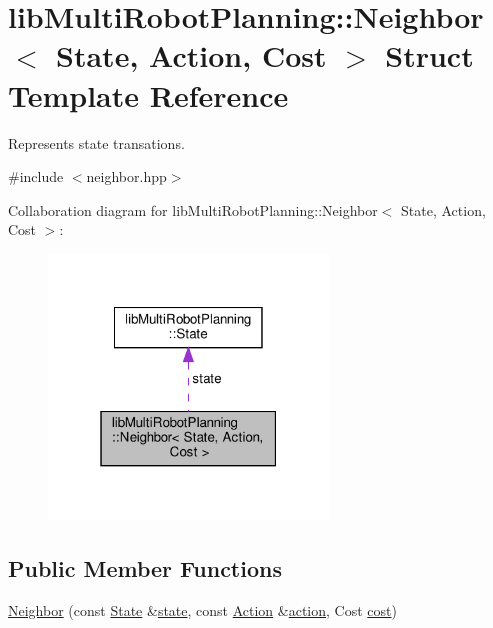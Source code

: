 \hypertarget{structlib_multi_robot_planning_1_1_neighbor}{}\section{lib\+Multi\+Robot\+Planning\+:\+:Neighbor$<$ State, Action, Cost $>$ Struct Template Reference}
\label{structlib_multi_robot_planning_1_1_neighbor}


Represents state transations.  




{\ttfamily \#include $<$neighbor.\+hpp$>$}



Collaboration diagram for lib\+Multi\+Robot\+Planning\+:\+:Neighbor$<$ State, Action, Cost $>$\+:
\nopagebreak
\begin{figure}[H]
\begin{center}
\leavevmode
\includegraphics[width=211pt]{structlib_multi_robot_planning_1_1_neighbor__coll__graph}
\end{center}
\end{figure}
\subsection*{Public Member Functions}
\begin{DoxyCompactItemize}
\item 
\hyperlink{structlib_multi_robot_planning_1_1_neighbor_a048152420e26c75abca920a4c5060c42}{Neighbor} (const \hyperlink{structlib_multi_robot_planning_1_1_state}{State} \&\hyperlink{structlib_multi_robot_planning_1_1_neighbor_ad4930766ec86e82ae342ffe94f5e0da4}{state}, const \hyperlink{namespacelib_multi_robot_planning_aba73fb71693f86a324adfa0e41e1053d}{Action} \&\hyperlink{structlib_multi_robot_planning_1_1_neighbor_a8b50ab4edc18e97d809dcd89c42bed44}{action}, Cost \hyperlink{structlib_multi_robot_planning_1_1_neighbor_af269be36c1200896a5990f7ee3d9da27}{cost})
\end{DoxyCompactItemize}
